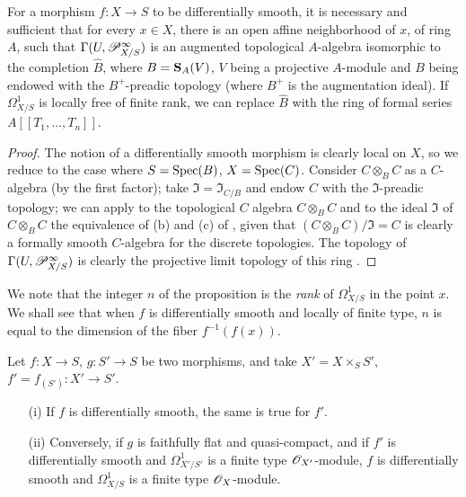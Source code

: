 \begin{proposition}[16.10.3]
\label{IV.16.10.3}
For a morphism $f:X \to S$ to be differentially smooth, it is necessary and sufficient that for every $x \in X$, there is an open affine neighborhood of $x$, of ring $A$, such that $\Gamma(U, \mathscr{P}_{X/S}^\infty)$ is an augmented topological $A$-algebra isomorphic to the completion $\hat{B}$, where $B = \mathbf{S}_A(V)$, $V$ being a projective $A$-module and $B$ being endowed with the $B^+$-preadic topology (where $B^+$ is the augmentation ideal).
If $\Omega_{X/S}^1$ is locally free of finite rank, we can replace $\hat{B}$ with the ring of formal series $A[[T_1, \dots, T_n]]$.
\end{proposition}

\begin{proof}
The notion of a differentially smooth morphism is clearly local on $X$, so we reduce to the case where $S = \operatorname{Spec}(B)$, $X = \operatorname{Spec}(C)$.
Consider $C \otimes_B C$ as a $C$-algebra (by the first factor);
take $\mathfrak{I} = \mathfrak{I}_{C/B}$ and endow $C$ with the $\mathfrak{I}$-preadic topology;
we can apply to the topological $C$ algebra $C \otimes_B C$ and to the ideal $\mathfrak{I}$ of $C \otimes_B C$ the equivalence of (b) and (c) of , given that $(C \otimes_B C)/\mathfrak{I} = C$ is clearly a formally smooth $C$-algebra for the discrete topologies.
The topology of $\Gamma(U, \mathscr{P}_{X/S}^\infty)$ is clearly the projective limit topology of this ring .
\end{proof}

We note that the integer $n$ of the proposition  is the \emph{rank} of $\Omega_{X/S}^1$ in the point $x$.
We shall see  that when $f$ is differentially smooth and locally of finite type, $n$ is equal to the dimension of the fiber $f^{-1}(f(x))$. 

\begin{proposition}[16.10.4]
\label{IV.16.10.4}
Let $f:X \to S$, $g:S' \to S$ be two morphisms, and take $X' = X \times_S S'$, $f' = f_{(S')}:X' \to S'$.
\begin{enumerate}
  \item[\rm{(i)}] If $f$ is differentially smooth, the same is true for $f'$. 
  \item[\rm{(ii)}] Conversely, if $g$ is faithfully flat and quasi-compact, and if $f'$ is differentially smooth and $\Omega_{X'/S'}^1$ is a finite type $\mathscr{O}_{X'}$-module, $f$ is differentially smooth and $\Omega_{X/S}^1$ is a finite type $\mathscr{O}_X$-module.
\end{enumerate}
\end{proposition}

